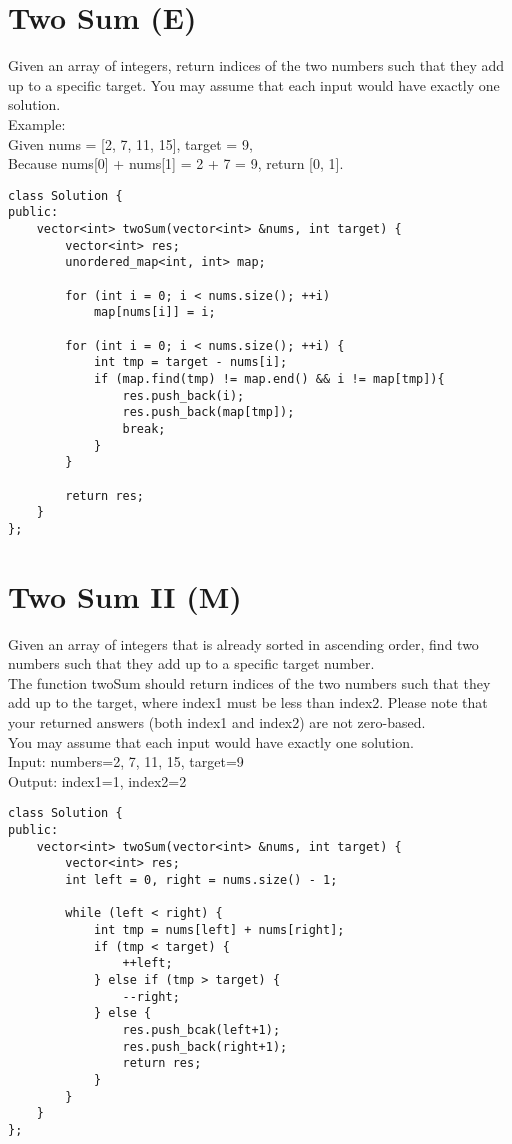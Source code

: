 \section{Two Sum (E)}
Given an array of integers, return indices of the two numbers such that they add up to a specific target. You may assume that each input would have exactly one solution. \\

Example:\\
Given nums = [2, 7, 11, 15], target = 9,\\
Because nums[0] + nums[1] = 2 + 7 = 9, return [0, 1].\\

\begin{lstlisting}
class Solution {
public:
    vector<int> twoSum(vector<int> &nums, int target) {
        vector<int> res;
        unordered_map<int, int> map;
        
        for (int i = 0; i < nums.size(); ++i)
            map[nums[i]] = i;
            
        for (int i = 0; i < nums.size(); ++i) {
            int tmp = target - nums[i];
            if (map.find(tmp) != map.end() && i != map[tmp]){
                res.push_back(i);
                res.push_back(map[tmp]);
                break;
            }
        }
        
        return res;
    }
};
\end{lstlisting}


\section{Two Sum II (M)}
Given an array of integers that is already sorted in ascending order, find two numbers such that they add up to a specific target number.\\

The function twoSum should return indices of the two numbers such that they add up to the target, where index1 must be less than index2. Please note that your returned answers (both index1 and index2) are not zero-based.\\

You may assume that each input would have exactly one solution.\\

Input: numbers={2, 7, 11, 15}, target=9\\
Output: index1=1, index2=2\\

\begin{lstlisting}
class Solution {
public:
    vector<int> twoSum(vector<int> &nums, int target) {
        vector<int> res;
        int left = 0, right = nums.size() - 1;
        
        while (left < right) {
            int tmp = nums[left] + nums[right];
            if (tmp < target) {
                ++left;
            } else if (tmp > target) {
                --right;
            } else {
                res.push_bcak(left+1);
                res.push_back(right+1);
                return res;
            }
        }
    }
};
\end{lstlisting}


